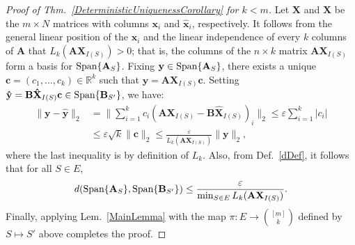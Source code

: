 \documentclass[9pt,twocolumn]{pnas-new}
\begin{document}
\begin{proof}[Proof of Thm.~\ref{DeterministicUniquenessCorollary} for $k < m$]
Let $\mathbf{X}$ and $\mathbf{\hat{X}}$ be the $m \times N$ matrices with columns $\mathbf{x}_i$ and $\mathbf{\hat x}_i$, respectively. It follows from the general linear position of the $\mathbf{x}_i$ and the linear independence of every $k$ columns of $\mathbf{A}$ that $L_k(\mathbf{AX}_{I(S)}) > 0$; that is, the columns of the $n \times k$ matrix $\mathbf{AX}_{I(S)}$ form a basis for $\text{\rm Span}\{\mathbf{A}_{S}\}$. Fixing $\mathbf{y} \in \text{\rm Span}\{\mathbf{A}_{S}\}$, there exists a unique $\mathbf{c} = (c_1, \ldots, c_k) \in \mathbb{R}^k$ such that $\mathbf{y} = \mathbf{AX}_{I(S)}\mathbf{c}$. Setting \mbox{$\mathbf{\hat{y}} = \mathbf{B\hat{X}}_{I(S)}\mathbf{c} \in \text{\rm Span}\{\mathbf{B}_{S'}\}$}, we have:
\begin{align*}
\|\mathbf{y} - \mathbf{\hat{y}}\|_2 
&= \|\sum_{i=1}^k c_i(\mathbf{AX}_{I(S)} - \mathbf{B\hat{X}}_{I(S)})_i\|_2
\leq \varepsilon \sum_{i=1}^k |c_i| \\
&\leq \varepsilon \sqrt{k}  \|\mathbf{c}\|_2 
\leq \frac{\varepsilon}{L_k(\mathbf{AX}_{I(S)})} \|\mathbf{y}\|_2,
\end{align*}
where the last inequality is by definition of $L_k$. Also, from Def.~\ref{dDef}, it follows that for all $S \in E$,
\begin{align}\label{rhs222}
d(\text{\rm Span}\{\mathbf{A}_S\}, \text{\rm Span}\{\mathbf{B}_{S'}\}) 
\leq \frac{\varepsilon}{ \min_{S \in E} L_k(\mathbf{AX}_{I(S)}) }.
\end{align}
Finally, applying Lem.~\ref{MainLemma} with the map $\pi: E \to {[m] \choose k}$ defined by $S \mapsto S'$ above completes the proof.
\end{proof}

 
\end{document}
